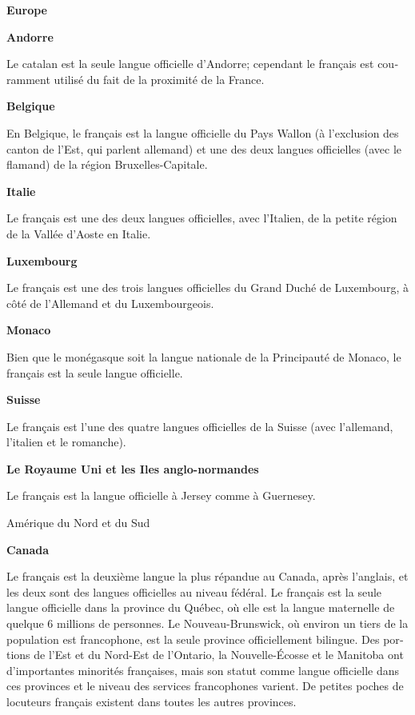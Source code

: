\begin{french}
\begin{multicols}{2}
\begin{center}
{\bf {\sc Europe}}
\end{center}

{\bf Andorre}

Le catalan est la seule langue officielle d'Andorre; cependant
le français est couramment utilisé du fait de la proximité de la
France.

{\bf Belgique}

En Belgique, le français est la langue officielle du Pays Wallon (à
l'exclusion des canton de l'Est, qui parlent allemand)
et une des deux langues officielles (avec le flamand) de la région
Bruxelles-Capitale.

{\bf Italie}

Le français est une des deux langues officielles, avec l'Italien, de la petite région de la Vallée d'Aoste en
Italie.

{\bf Luxembourg}

Le français est une des trois langues officielles du Grand Duché de
Luxembourg, à côté de l'Allemand et du Luxembourgeois.

{\bf Monaco}

Bien que le monégasque soit la langue nationale de la Principauté de
Monaco, le français est la seule langue officielle.

{\bf Suisse}

Le français est l'une des quatre langues officielles de la
Suisse (avec l'allemand, l'italien et le romanche).

{\bf Le Royaume Uni et les Iles  anglo-normandes}

Le français est la langue officielle à Jersey comme à Guernesey.

\begin{center}
{\sc Amérique du Nord et du Sud}
\end{center}

{\bf Canada}

Le français est la deuxième langue la plus répandue au Canada, après
l'anglais, et les deux sont des langues officielles au niveau
fédéral. Le français est la seule langue officielle dans la province
du Québec, où elle est la langue maternelle de quelque 6 millions de
personnes. Le Nouveau-Brunswick, où environ un tiers de la population
est francophone, est la seule province officiellement bilingue. Des
portions de l'Est et du Nord-Est de l'Ontario, la
Nouvelle-Écosse et le Manitoba ont d'importantes minorités françaises,
mais son statut comme langue officielle dans ces provinces et le
niveau des services francophones varient. De petites poches de
locuteurs français existent dans toutes les autres provinces.


\end{multicols}
\end{french}
